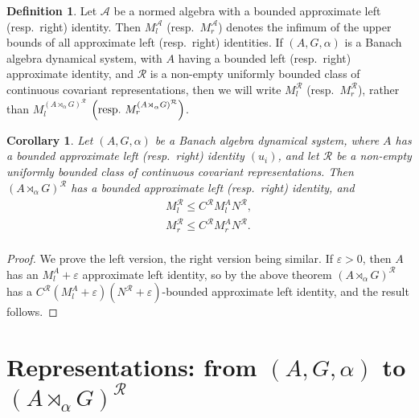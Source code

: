 \documentclass{amsart}
\theoremstyle{plain}
\newtheorem{corol}[theorem]{Corollary}
\theoremstyle{definition}
\newtheorem{defn}[theorem]{Definition}
\numberwithin{equation}{section}
\begin{document}
\begin{defn}\label{d:infimum_of_bounds}
 Let $\mathcal{A}$ be a normed algebra with a bounded approximate left (resp.\ right) identity. Then $M_l^\mathcal{A}$ (resp.\ $M_r^\mathcal{A}$) denotes the infimum of the upper bounds of all approximate left (resp.\ right) identities. If ${(A,G,\alpha)}$ is a Banach algebra dynamical system, with $A$ having a bounded left (resp.\ right) approximate identity, and ${\mathcal R}$ is a non-empty uniformly bounded class of continuous covariant representations, then we will write $M_l^{\mathcal R}$ (resp.\ $M_r^{\mathcal R}$), rather than $M_l^{(A {\rtimes}_\alpha G)^\mathcal{R}}$ $\left( \textup{resp.\ }M_r^{(A {\rtimes}_\alpha G)^\mathcal{R}} \right)$.
\end{defn}

\begin{corol}\label{c:approximate_identities}
Let ${(A,G,\alpha)}$ be a Banach algebra dynamical system, where $A$ has a bounded approximate left \textup{(}resp.\ right\textup{)} identity $(u_i)$, and let $\mathcal{R}$ be a non-empty uniformly bounded class of continuous covariant representations. Then ${(A {\rtimes}_\alpha G)^\mathcal{R}}$ has a bounded approximate left \textup{(}resp.\ right\textup{)} identity, and
\begin{align*}
 M_l^{\mathcal R} \leq {{C^{\mathcal R}}} M_l^A {N^{\mathcal R}}, \\
 M_r^{\mathcal R} \leq {{C^{\mathcal R}}} M_r^A {N^{\mathcal R}}. \\
\end{align*}
\end{corol}

\begin{proof}
 We prove the left version, the right version being similar. If ${\varepsilon} > 0$, then $A$ has an $M_l^A + {\varepsilon}$ approximate left identity, so by the above theorem ${(A {\rtimes}_\alpha G)^\mathcal{R}}$ has a ${{C^{\mathcal R}}} (M_l^A + {\varepsilon}) ({N^{\mathcal R}} + {\varepsilon})$-bounded approximate left identity, and the result follows.
\end{proof}

\section{Representations: from ${(A,G,\alpha)}$ to ${(A {\rtimes}_\alpha G)^\mathcal{R}}$}\label{sec:from_dynsys_to_crosprod}
\end{document}

